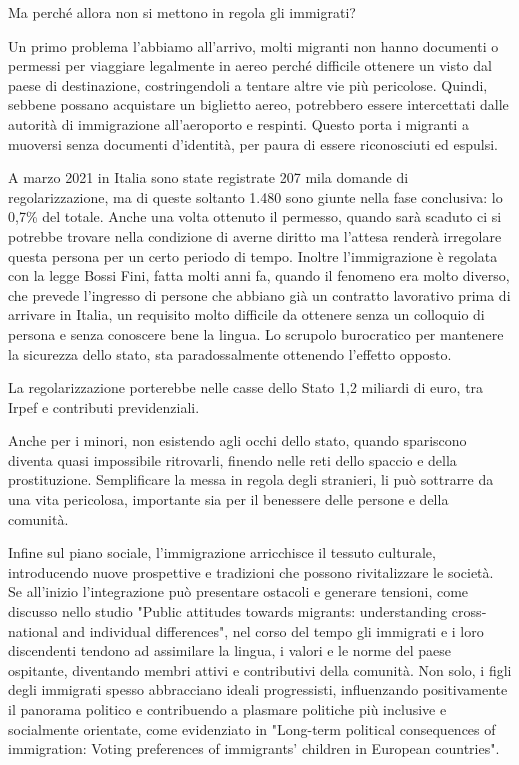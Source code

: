 \documentclass[12pt]{book} %
\begin{document}
Ma perché allora non si mettono in regola gli immigrati? 

Un primo problema l'abbiamo all'arrivo, molti migranti non hanno documenti o permessi per viaggiare legalmente in aereo perché difficile ottenere un visto dal paese di destinazione, costringendoli a tentare altre vie più pericolose. Quindi, sebbene possano acquistare un biglietto aereo, potrebbero essere intercettati dalle autorità di immigrazione all'aeroporto e respinti. Questo porta i migranti a muoversi senza documenti d'identità, per paura di essere riconosciuti ed espulsi.

A marzo 2021 in Italia sono state registrate 207 mila domande di regolarizzazione, ma di queste soltanto 1.480 sono
giunte nella fase conclusiva: lo 0,7\% del totale. Anche una volta ottenuto il permesso, quando sarà scaduto ci si
potrebbe trovare nella condizione di averne diritto ma l'attesa renderà irregolare questa persona
per un certo periodo di tempo. Inoltre l'immigrazione è regolata con la legge Bossi Fini, fatta molti anni fa, quando il fenomeno era molto diverso,
che prevede l'ingresso di persone che abbiano già un contratto lavorativo prima di arrivare in Italia, un
requisito molto difficile da ottenere senza un colloquio di persona e senza conoscere bene la lingua. 
Lo scrupolo burocratico per mantenere la sicurezza dello stato, sta paradossalmente ottenendo l'effetto opposto.

La regolarizzazione porterebbe nelle casse dello Stato 1,2 miliardi di euro, tra Irpef e contributi previdenziali. 

Anche per i minori, non esistendo agli occhi dello
stato, quando spariscono diventa quasi impossibile ritrovarli, finendo nelle reti dello spaccio e della prostituzione.
Semplificare la messa in regola degli stranieri, li può sottrarre da una vita pericolosa, importante sia per il
benessere delle persone e della comunità. 

Infine sul piano sociale, l'immigrazione arricchisce il tessuto culturale, introducendo nuove prospettive e tradizioni che possono rivitalizzare le società. Se all'inizio l'integrazione può presentare ostacoli e generare tensioni, come discusso nello studio "Public attitudes towards migrants: understanding cross‐national and individual differences", nel corso del tempo gli immigrati e i loro discendenti tendono ad assimilare la lingua, i valori e le norme del paese ospitante, diventando membri attivi e contributivi della comunità. Non solo, i figli degli immigrati spesso abbracciano ideali progressisti, influenzando positivamente il panorama politico e contribuendo a plasmare politiche più inclusive e socialmente orientate, come evidenziato in  "Long-term political consequences of immigration: Voting preferences of immigrants’ children in European countries".
\end{document}
